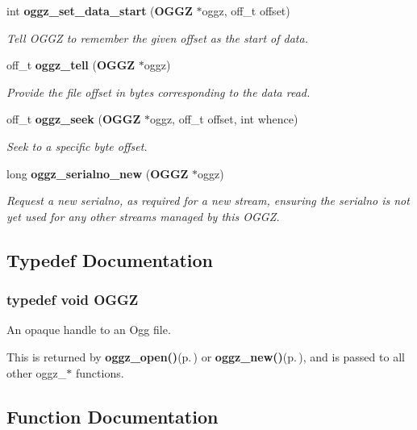 \begin{CompactItemize}
int {\bf oggz\_\-set\_\-data\_\-start} ({\bf OGGZ} $\ast$oggz, off\_\-t offset)
\begin{CompactList}\small\item\em Tell OGGZ to remember the given offset as the start of data. \item\end{CompactList}\item 
off\_\-t {\bf oggz\_\-tell} ({\bf OGGZ} $\ast$oggz)
\begin{CompactList}\small\item\em Provide the file offset in bytes corresponding to the data read. \item\end{CompactList}\item 
off\_\-t {\bf oggz\_\-seek} ({\bf OGGZ} $\ast$oggz, off\_\-t offset, int whence)
\begin{CompactList}\small\item\em Seek to a specific byte offset. \item\end{CompactList}\item 
long {\bf oggz\_\-serialno\_\-new} ({\bf OGGZ} $\ast$oggz)
\begin{CompactList}\small\item\em Request a new serialno, as required for a new stream, ensuring the serialno is not yet used for any other streams managed by this OGGZ. \item\end{CompactList}\end{CompactItemize}


\subsection{Typedef Documentation}
\subsubsection{\setlength{\rightskip}{0pt plus 5cm}typedef void {\bf OGGZ}}\label{oggz_8h_a0}


An opaque handle to an Ogg file. 

This is returned by {\bf oggz\_\-open()}{\rm (p.\,\pageref{oggz_8h_a5})} or {\bf oggz\_\-new()}{\rm (p.\,\pageref{oggz_8h_a4})}, and is passed to all other oggz\_\-$\ast$ functions. 

\subsection{Function Documentation}
